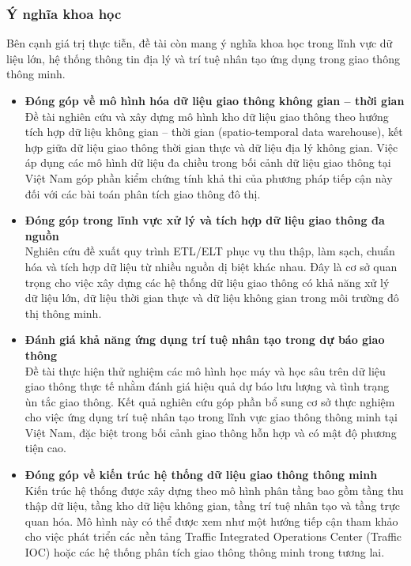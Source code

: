 \subsubsection{Ý nghĩa khoa học}

Bên cạnh giá trị thực tiễn, đề tài còn mang ý nghĩa khoa học trong lĩnh vực dữ liệu lớn, hệ thống thông tin địa lý và trí tuệ nhân tạo ứng dụng trong giao thông thông minh.

\begin{itemize}

    \item \textbf{Đóng góp về mô hình hóa dữ liệu giao thông không gian – thời gian}\\
    Đề tài nghiên cứu và xây dựng mô hình kho dữ liệu giao thông theo hướng tích hợp dữ liệu không gian – thời gian (spatio-temporal data warehouse), kết hợp giữa dữ liệu giao thông thời gian thực và dữ liệu địa lý không gian. Việc áp dụng các mô hình dữ liệu đa chiều trong bối cảnh dữ liệu giao thông tại Việt Nam góp phần kiểm chứng tính khả thi của phương pháp tiếp cận này đối với các bài toán phân tích giao thông đô thị.

    \item \textbf{Đóng góp trong lĩnh vực xử lý và tích hợp dữ liệu giao thông đa nguồn}\\
    Nghiên cứu đề xuất quy trình ETL/ELT phục vụ thu thập, làm sạch, chuẩn hóa và tích hợp dữ liệu từ nhiều nguồn dị biệt khác nhau. Đây là cơ sở quan trọng cho việc xây dựng các hệ thống dữ liệu giao thông có khả năng xử lý dữ liệu lớn, dữ liệu thời gian thực và dữ liệu không gian trong môi trường đô thị thông minh.

    \item \textbf{Đánh giá khả năng ứng dụng trí tuệ nhân tạo trong dự báo giao thông}\\
    Đề tài thực hiện thử nghiệm các mô hình học máy và học sâu trên dữ liệu giao thông thực tế nhằm đánh giá hiệu quả dự báo lưu lượng và tình trạng ùn tắc giao thông. Kết quả nghiên cứu góp phần bổ sung cơ sở thực nghiệm cho việc ứng dụng trí tuệ nhân tạo trong lĩnh vực giao thông thông minh tại Việt Nam, đặc biệt trong bối cảnh giao thông hỗn hợp và có mật độ phương tiện cao.

    \item \textbf{Đóng góp về kiến trúc hệ thống dữ liệu giao thông thông minh}\\
    Kiến trúc hệ thống được xây dựng theo mô hình phân tầng bao gồm tầng thu thập dữ liệu, tầng kho dữ liệu không gian, tầng trí tuệ nhân tạo và tầng trực quan hóa. Mô hình này có thể được xem như một hướng tiếp cận tham khảo cho việc phát triển các nền tảng Traffic Integrated Operations Center (Traffic IOC) hoặc các hệ thống phân tích giao thông thông minh trong tương lai.

\end{itemize}

